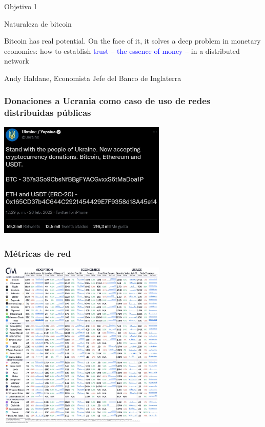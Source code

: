 \begin{frame}
\huge
\centering
    Objetivo 1
\end{frame}

\begin{frame}{Naturaleza de bitcoin}

\vspace{5mm}
\begin{displayquote}
Bitcoin has real potential. On the face of it, it solves a deep problem in monetary economics: how to establish \textcolor{blue}{trust – the essence of money} – in a distributed network
\end{displayquote}
\raggedleft Andy Haldane, Economista Jefe del Banco de Inglaterra

    \end{frame}

\begin{frame}
    \frametitle{Donaciones a Ucrania como caso de uso de redes distribuidas públicas}

        \begin{center}
         \includegraphics[width=0.6\textwidth]{images/C2/c2_Ucrania adress.jpg}
         \end{center}

\end{frame}

\begin{frame}
    \frametitle{Métricas de red}

        \begin{center}
         \includegraphics[width=0.6\textwidth]{images/C2/annex/coinmetrcis_monitor.jpeg}
         \end{center}

\end{frame}

